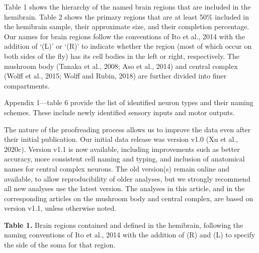 \documentclass{article}
\begin{document}
Table 1 shows the hierarchy of the named brain regions that are included in the hemibrain. Table 2 shows the primary regions that are at least 50\% included in the hemibrain sample, their approximate size, and their completion percentage. Our names for brain regions follow the conventions of Ito et al., 2014 with the addition of ‘(L)’ or ‘(R)’ to indicate whether the region (most of which occur on both sides of the fly) has its cell bodies in the left or right, respectively. The mushroom body (Tanaka et al., 2008; Aso et al., 2014) and central complex (Wolff et al., 2015; Wolff and Rubin, 2018) are further divided into finer compartments.

Appendix 1—table 6 provide the list of identified neuron types and their naming schemes. These include newly identified sensory inputs and motor outputs.

The nature of the proofreading process allows us to improve the data even after their initial publication. Our initial data release was version v1.0 (Xu et al., 2020c). Version v1.1 is now available, including improvements such as better accuracy, more consistent cell naming and typing, and inclusion of anatomical names for central complex neurons. The old version(s) remain online and available, to allow reproducibility of older analyses, but we strongly recommend all new analyses use the latest version. The analyses in this article, and in the corresponding articles on the mushroom body and central complex, are based on version v1.1, unless otherwise noted.

\noindent \textbf{Table 1.} Brain regions contained and defined in the hemibrain, following the naming conventions of Ito et al., 2014 with the addition of (R) and (L) to specify the side of the soma for that region.
\end{document}
